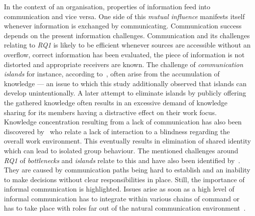 In the context of an organisation, properties of information feed into communication and vice versa. One side of this \emph{mutual influence} manifests itself whenever information is exchanged by communicating. Communication success depends on the present information challenges. Communication and its challenges relating to \textit{RQ1} is likely to be efficient whenever sources are accessible without an overflow, correct information has been evaluated, the piece of information is not distorted and appropriate receivers are known. The challenge of \emph{communication islands} for instance, according to~\citet{kettunen2008agileorg}, often arise from the accumulation of knowledge — an issue to which this study additionally observed that islands can develop unintentionally. A later attempt to eliminate islands by publicly offering the gathered knowledge often results in an excessive demand of knowledge sharing for its members having a distractive effect on their work focus. Knowledge concentration resulting from a lack of communication has also been discovered by~\citet{herbsleb2003empiricalcommunication} who relate a lack of interaction to a blindness regarding the overall work environment. This eventually results in elimination of shared identity which can lead to isolated group behaviour. The mentioned challenges around \textit{RQ1} of \emph{bottlenecks} and \emph{islands} relate to this and have also been identified by~\citet{curtis1988fieldstudysoftwaredesign}. They are caused by communication paths being hard to establish and an inability to make decisions without clear responsibilities in place. Still, the importance of informal communication is highlighted. Issues arise as soon as a high level of informal communication has to integrate within various chains of command or has to take place with roles far out of the natural communication environment~\citep{curtis1988fieldstudysoftwaredesign}.

